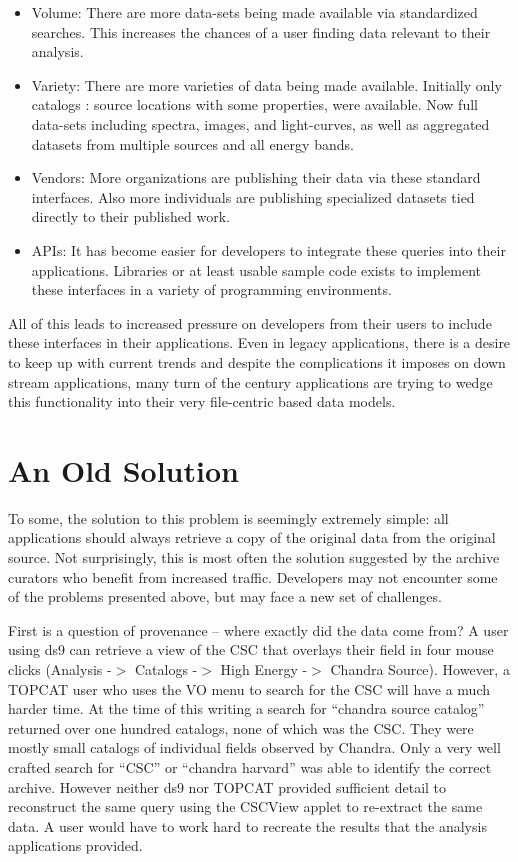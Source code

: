 \documentclass[11pt,twoside]{article}
\begin{document}
\begin{itemize}

\item Volume: There are more data-sets being made available via standardized searches. This increases the chances of a user finding data relevant to their analysis. 
\item Variety:  There are more varieties of data being made available.  Initially only catalogs : source locations with some properties, were available.  Now full data-sets including spectra, images, and light-curves, as well as aggregated
datasets from multiple sources and all energy bands.
\item Vendors: More organizations are publishing their data via these 
standard interfaces.  Also more individuals are publishing specialized datasets tied directly 
to their published work.
\item APIs: It has become easier for developers to integrate these queries into their applications.  Libraries or at least usable sample code exists to implement these interfaces in a variety of programming environments.

\end{itemize}

All of this leads to increased pressure on developers  from their users to
 include these interfaces in their applications.    Even in legacy applications, there is a desire to keep up with current trends and despite the 
complications it imposes on down stream applications, many turn
of the century applications are trying to wedge this functionality into
their very file-centric based data models.



\section{An Old Solution}

To some, the solution to this problem is seemingly extremely simple:  all 
applications should always retrieve a copy of the original data from the 
original source.  Not surprisingly, this is most often the solution 
suggested by the archive curators who benefit from increased traffic. 
Developers may not encounter some of the problems presented 
above, but may face a new set of challenges.


First is a question of provenance -- where exactly did the data come from?
A user using ds9 can retrieve a view of the CSC that overlays their field in
four mouse clicks  (Analysis -$>$ Catalogs -$>$ High Energy -$>$ Chandra Source).
However, a TOPCAT user who uses the VO menu to search for the CSC will have
a much harder time.  At the time of this writing a search for
 ``chandra source catalog'' returned over one hundred catalogs, none of
which was the CSC.  They were mostly small catalogs of individual fields 
observed by Chandra.  Only a very well crafted search for ``CSC'' or ``chandra harvard'' was able to identify the correct archive.  However neither ds9
nor TOPCAT provided sufficient detail to reconstruct the same query using
the CSCView applet to re-extract the same data.  A user would have to work
hard to recreate the results that the analysis applications provided.
\end{document}
